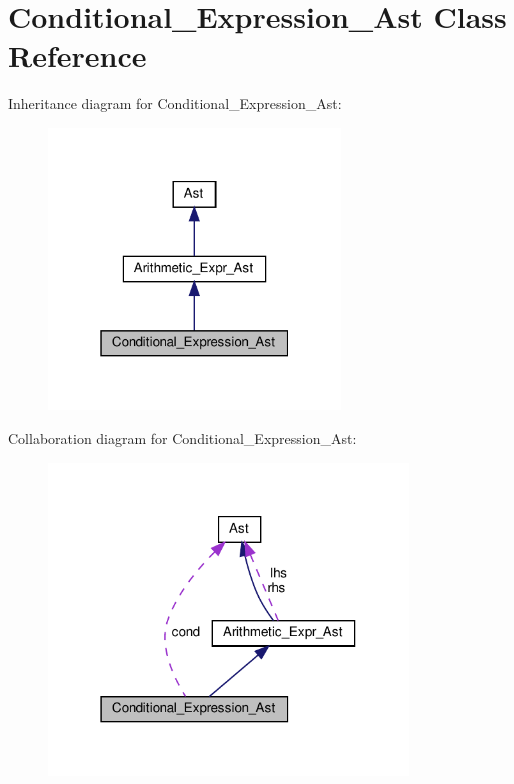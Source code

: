 \hypertarget{classConditional__Expression__Ast}{}\section{Conditional\+\_\+\+Expression\+\_\+\+Ast Class Reference}
\label{classConditional__Expression__Ast}


Inheritance diagram for Conditional\+\_\+\+Expression\+\_\+\+Ast\+:
\nopagebreak
\begin{figure}[H]
\begin{center}
\leavevmode
\includegraphics[width=220pt]{classConditional__Expression__Ast__inherit__graph}
\end{center}
\end{figure}


Collaboration diagram for Conditional\+\_\+\+Expression\+\_\+\+Ast\+:
\nopagebreak
\begin{figure}[H]
\begin{center}
\leavevmode
\includegraphics[width=271pt]{classConditional__Expression__Ast__coll__graph}
\end{center}
\end{figure}
